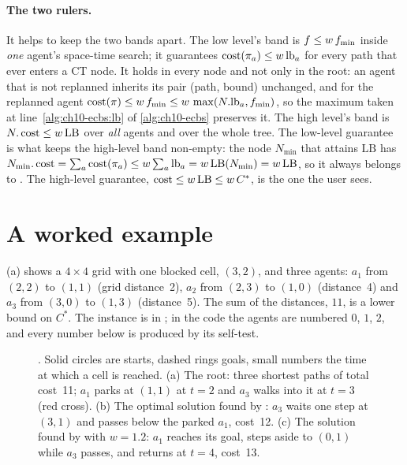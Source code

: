 \paragraph{The two rulers.}
It helps to keep the two bands apart. The low level's band is
$f \le w\,f_{\min}$ inside \emph{one} agent's space-time search; it
guarantees $\operatorname{cost}(\pi_a) \le w\,\mathrm{lb}_a$ for every path that ever enters
a CT node. It holds in every node and not only in the root: an agent that is
not replanned inherits its pair (path, bound) unchanged, and for the
replanned agent $\operatorname{cost}(\pi) \le w\,f_{\min} \le
w\,\max(N.\mathrm{lb}_a, f_{\min})$, so the maximum taken at
line~\ref{alg:ch10-ecbs:lb} of \cref{alg:ch10-ecbs} preserves it. The high level's band is $N.\operatorname{cost} \le w\,\mathrm{LB}$ over
\emph{all} agents and over the whole tree. The low-level guarantee is what
keeps the high-level band non-empty: the node $N_{\min}$ that attains
$\mathrm{LB}$ has $N_{\min}.\operatorname{cost} = \sum_a \operatorname{cost}(\pi_a) \le w \sum_a
\mathrm{lb}_a = w\,\mathrm{LB}(N_{\min}) = w\,\mathrm{LB}$, so it always
belongs to \Focal. The high-level guarantee, $\operatorname{cost} \le w\,\mathrm{LB} \le
w\,C^*$, is the one the user sees.

\section{A worked example}
\label{sec:ch10-example}

\begin{example}
\label{ex:ch10-grid}
(a) shows a $4 \times 4$ grid with one
blocked cell, $(3,2)$, and three agents: $a_1$ from $(2,2)$ to $(1,1)$
(grid distance~2), $a_2$ from $(2,3)$ to $(1,0)$ (distance~4) and $a_3$ from
$(3,0)$ to $(1,3)$ (distance~5). The sum of the distances, $11$, is a lower
bound on $C^*$. The instance is  in
; in the code the agents are numbered $0$, $1$, $2$, and
every number below is produced by its self-test.
\end{example}

\begin{figure}[tb]
  \centering
  \caption{. Solid circles are starts, dashed rings goals,
  small numbers the time at which a cell is reached. (a) The root: three
  shortest paths of total cost~11; $a_1$ parks at $(1,1)$ at $t = 2$ and
  $a_3$ walks into it at $t = 3$ (red cross). (b) The optimal solution found
  by \cbs: $a_3$ waits one step at $(3,1)$ and passes below the parked $a_1$,
  cost~12. (c) The solution found by \ecbs with $w = 1.2$: $a_1$ reaches its
  goal, steps aside to $(0,1)$ while $a_3$ passes, and returns at $t = 4$,
  cost~13.}
  \label{fig:ch10-example-instance}
\end{figure}


